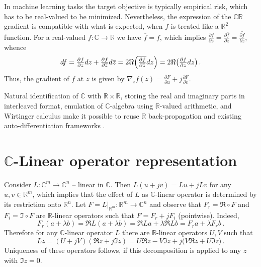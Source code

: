 \documentclass[a4paper,10pt,twocolumn]{article}
\newcommand{\real}{\mathbb{R}}
\newcommand{\cplx}{\mathbb{C}}
\newcommand{\conj}[1]{\overline{#1}}
\begin{document}
In machine learning tasks the target objective is typically empirical risk, which has to
be real-valued to be minimized. Nevertheless, the expression of the $\cplx\real$ gradient
is compatible with what is expected, when $f$ is treated like a $\real^2$ function. For a
real-valued $f\colon \cplx \to \real$ we have $\conj{f} = f$, which implies $
  \tfrac{\partial f}{\partial \conj{z}}
    = \tfrac{\partial \conj{f}}{\partial \conj{z}}
    = \conj{\tfrac{\partial f}{\partial z}}
$, whence
$$
df
  = \tfrac{\partial f}{\partial z} dz
    + \tfrac{\partial f}{\partial \conj{z}} d\conj{z}
  = 2 \Re \Bigl(
    \conj{\tfrac{\partial f}{\partial \conj{z}}} dz
  \Bigr)
  = 2 \Re \bigl(
    \tfrac{\partial f}{\partial z} dz
  \bigr)
  \,. $$
Thus, the gradient of $f$ at $z$ is given by $
  \nabla_z f(z)
    = \tfrac{\partial F}{\partial u}
      + j \tfrac{\partial F}{\partial v}
$.

Natural identification of $\cplx$ with $\real\times \real$, storing the real and imaginary
parts in interleaved format, emulation of $\cplx$-algebra using $\real$-valued arithmetic,
and Wirtinger calculus make it possible to reuse $\real$ back-propagation and existing
auto-differentiation frameworks \citep{trabelsi_deep_2018}.


\section{$\cplx$-Linear operator representation} %
\label{sec:c-linear_operator_representation}

Consider $L \colon \cplx^m \to \cplx^n$ -- linear in $\cplx$. Then $
  L(u + jv) = L u + j L v
$ for any $u, v \in \real^m$, which implies that the effect of $L$ as $\cplx$-linear
operator is determined by its restriction onto $\real^n$. Let $
  F = L\vert_{\real^m}
  \colon \real^m \to \cplx^n
$ and observe that $F_r = \Re \circ F$ and $F_i = \Im \circ F$ are $\real$-linear operators
such that $F = F_r + j F_i$ (pointwise). Indeed,
$$
  F_r(a + \lambda b)
  = \Re L(a + \lambda b)
  = \Re L a + \lambda \Re L b
  = F_r a + \lambda F_r b
  \,. $$
Therefore for any $\cplx$-linear operator $L$ there are $\real$-linear operators $U, V$
such that
$$
L z 
  = (U + j V) (\Re z + j \Im z)
  = U \Re z - V \Im z + j \bigl( V \Re z + U \Im z \bigr)
  \,. $$
Uniqueness of these operators follows, if this decomposition is applied to any $z$ with
$\Im z = 0$.


\end{document}
